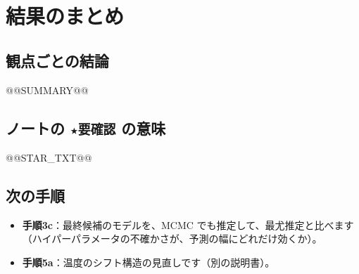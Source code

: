 \documentclass[paper=a4paper,fontsize=10.5pt,line_length=44zw,number_of_lines=38]{jlreq}
\newenvironment{points}{\begin{itemize}[label=$\triangleright$,leftmargin=1.5\zw,itemsep=0.3ex,topsep=0.5ex,parsep=0pt]}{\end{itemize}}
\newcommand{\pt}[1]{\item \textbf{#1}：}
\begin{document}
\section{結果のまとめ}

\subsection{観点ごとの結論}
@@SUMMARY@@

\subsection{ノートの \texttt{★要確認} の意味}
@@STAR_TXT@@

\subsection{次の手順}
\begin{points}
\pt{手順3c}最終候補のモデルを、MCMC でも推定して、最尤推定と比べます（ハイパーパラメータの不確かさが、予測の幅にどれだけ効くか）。
\pt{手順5a}温度のシフト構造の見直しです（別の説明書）。
\end{points}
\end{document}
